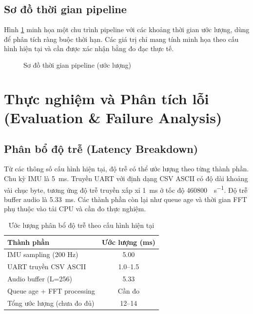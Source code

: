 \section{Sơ đồ thời gian pipeline}
Hình \ref{fig:pipeline_timing} minh họa một chu trình pipeline với các khoảng thời gian ước lượng, dùng để phân tích ràng buộc thời hạn. Các giá trị chỉ mang tính minh họa theo cấu hình hiện tại và cần được xác nhận bằng đo đạc thực tế.

\begin{figure}[H]
\centering
{}
\caption{Sơ đồ thời gian pipeline (ước lượng)}
\label{fig:pipeline_timing}
\end{figure}

\chapter{Thực nghiệm và Phân tích lỗi (Evaluation \& Failure Analysis)}

\section{Phân bổ độ trễ (Latency Breakdown)}
Từ các thông số cấu hình hiện tại, độ trễ có thể ước lượng theo từng thành phần. Chu kỳ IMU là \SI{5}{\milli\second}. Truyền UART với định dạng CSV ASCII có độ dài khoảng vài chục byte, tương ứng độ trễ truyền xấp xỉ \SI{1}{\milli\second} ở tốc độ \SI{460800}{\bit\per\second}. Độ trễ buffer audio là \SI{5.33}{\milli\second}. Các thành phần còn lại như queue age và thời gian FFT phụ thuộc vào tải CPU và cần đo thực nghiệm.

\begin{table}[H]
\centering
\caption{Ước lượng phân bổ độ trễ theo cấu hình hiện tại}
\label{tab:latency_breakdown}
\vspace{0.2cm}
\renewcommand{\arraystretch}{1.2}
\begin{tabular}{lc}
\toprule
\textbf{Thành phần} & \textbf{Ước lượng (ms)} \\
\midrule
IMU sampling (200 Hz) & 5.00 \\
UART truyền CSV ASCII & 1.0--1.5 \\
Audio buffer (L=256) & 5.33 \\
Queue age + FFT processing & Cần đo \\
\midrule
Tổng ước lượng (chưa đo đủ) & 12--14 \\
\bottomrule
\end{tabular}
\end{table}

